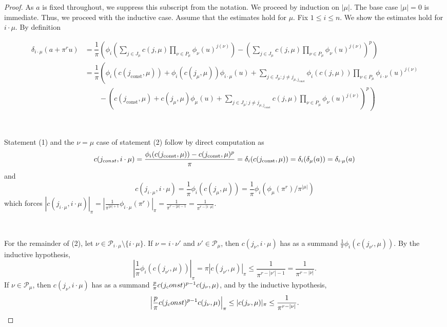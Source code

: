 \documentclass[10pt,a4paper]{amsart}
\renewcommand{\d}{\delta}
\begin{document}
\begin{proof} As $a$ is fixed throughout, we suppress this subscript from the notation. We proceed by induction on $|\mu|$. The base case $|\mu| = 0$ is immediate. Thus, we proceed with the inductive case. Assume that the estimates hold for $\mu$. Fix $1 \leq i \leq n$. We show the estimates hold for $i \cdot \mu$. By definition

\begin{align*}
	\delta_{i\cdot \mu}(a + \pi^ru)
	&= \dfrac{1}{\pi}\left(\phi_i\left(\sum_{j\in J_\mu} c(j,\mu)\prod_{\nu\in P_\mu} \phi_\nu(u)^{j(\nu)}\right) - \left(\sum_{j\in J_\mu} c(j,\mu)\prod_{\nu\in P_\mu} \phi_\nu(u)^{j(\nu)}\right)^p\right)\\
	&=\dfrac{1}{\pi}\left(\phi_i(c(j_{\mathrm{const}},\mu)) + \phi_i(c(j_\mu,\mu))\phi_{i\cdot\mu}(u) + \sum_{j\in J_\mu\colon j\neq j_{\mu,j_{\mathrm{const}}}}\phi_i(c(j,\mu))\prod_{\nu\in P_\mu} \phi_{i\cdot\nu}(u)^{j(\nu)} \right.\\
	&\qquad - \left.\left(c(j_{\mathrm{const}},\mu) + c(j_\mu,\mu)\phi_{\mu}(u) + \sum_{j\in J_\mu\colon j\neq j_{\mu,j_{\mathrm{const}}}}c(j,\mu)\prod_{\nu\in P_\mu} \phi_{\nu}(u)^{j(\nu)}\right)^p\right)
\end{align*}

\

Statement (1) and the $\nu = \mu$ case of statement (2) follow by direct computation as 
\[c(j_{\textup{const}},i \cdot \mu) = \dfrac{\phi_i(c(j_{\mathrm{const}},\mu)) -c(j_{\mathrm{const}},\mu)^p}{\pi} = \d_i(c(j_{\mathrm{const}},\mu)) = \d_i(\d_\mu(a)) = \d_{i \cdot \mu}(a)\] and 
$$c(j_{i \cdot \mu},i \cdot \mu ) = \frac{1}{\pi}\phi_i(c(j_\mu,\mu)) =  \frac{1}{\pi} \phi_i(\phi_\mu(\pi^r)/\pi^{|\mu|})$$ which forces $|c(j_{i \cdot \mu},i \cdot \mu )|_\pi = \left| \frac{1}{\pi^{|\mu|+1}} \phi_{i \cdot \mu}(\pi^r) \right|_\pi = \frac{1}{\pi^{r - |\mu| - 1}} =\frac{1}{\pi^{r - |i \cdot \mu|}}$.
 
\

For the remainder of (2), let $\nu\in\mathcal{P}_{i\cdot \mu}\setminus \{i\cdot \mu\}$.  If $\nu =i\cdot  \nu'$ and $\nu'\in \mathcal{P}_\mu$, then $c(j_\nu,i\cdot \mu)$ has as a summand $\frac{1}{\pi}\phi_i(c(j_{\nu'}, \mu))$.  By the inductive hypothesis, 
\[\left|\frac{1}{\pi}\phi_i(c(j_{\nu'}, \mu))\right|_\pi  = \pi\left|c(j_{\nu'}, \mu)\right|_\pi\leq \frac{1}{\pi^{r-|\nu'| - 1}} = \frac{1}{\pi^{r-|\nu|}}.\]
If $\nu\in \mathcal{P}_\mu$, then $c(j_\nu,i\cdot \mu)$ has as a summand $\frac{p}{\pi}c(j_\textup{const})^{p-1}c(j_\nu,\mu)$, and by the inductive hypothesis,
\[\left|\frac{p}{\pi}c(j_\textup{const})^{p-1}c(j_\nu,\mu)\right|_\pi \leq |c(j_\nu,\mu)|_\pi \leq \frac{1}{\pi^{r-|\nu|}}.\]


\end{proof}
\end{document}
